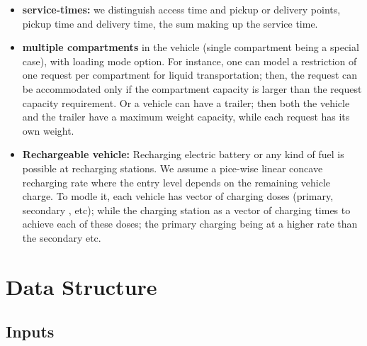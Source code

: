 \documentclass[12pt,a4paper]{article}
\begin{document}
\begin{itemize}
\item {\bf  service-times:} we distinguish access time and pickup or delivery points, pickup time and delivery time, the sum making up the service time.
\item {\bf multiple compartments} in the vehicle (single compartment being a special case), with loading mode option. For instance, one can model a restriction of one request per compartment for liquid transportation; then, the request can be accommodated only if the compartment capacity is larger than the request capacity requirement. Or a vehicle can have a trailer; then both the vehicle and the trailer have a maximum weight capacity, while each request has its own weight. 
\item {\bf Rechargeable vehicle:} Recharging electric battery or any kind of fuel is possible at recharging stations. We assume a pice-wise linear concave recharging rate where the entry level depends on the remaining vehicle charge. To modle it, each vehicle has  	vector of charging doses (primary, secondary , etc);  while the charging station as a vector of charging times to achieve each of these doses; the primary charging being at a higher rate than the secondary etc.

\end{itemize}


\appendix
\section{Data Structure}

\subsection{Inputs}
\end{document}
